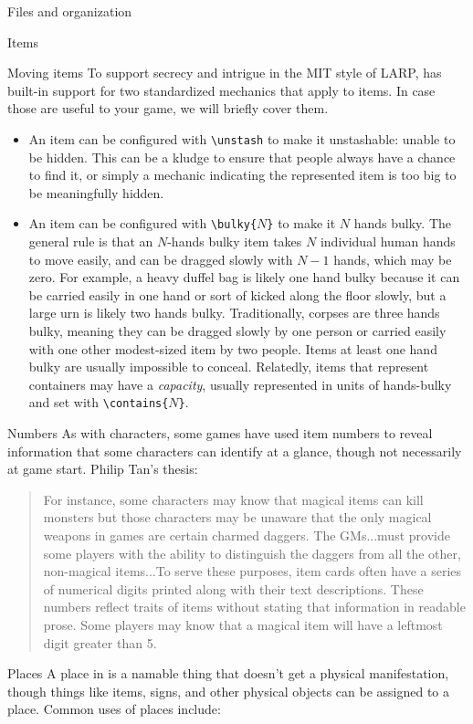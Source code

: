 \documentclass[sheet]{GameTexBase}
\begin{document}
\begin{section}{Files and organization}
\begin{subsection}{Items}
\begin{subsubsection}{Moving items}
To support secrecy and intrigue in the MIT style of LARP, \gametex{} has built-in support for two standardized mechanics that apply to items.  In case those are useful to your game, we will briefly cover them.
\begin{itemize}
\item An item can be configured with \lstinline|\unstash| to make it unstashable: unable to be hidden.  This can be a kludge to ensure that people always have a chance to find it, or simply a mechanic indicating the represented item is too big to be meaningfully hidden.
\item An item can be configured with \texttt{\textbackslash{}bulky\{$N$\}} to make it $N$ hands bulky.  The general rule is that an $N$-hands bulky item takes $N$ individual human hands to move easily, and can be dragged slowly with $N-1$ hands, which may be zero.  For example, a heavy duffel bag is likely one hand bulky because it can be carried easily in one hand or sort of kicked along the floor slowly, but a large urn is likely two hands bulky.  Traditionally, corpses are three hands bulky, meaning they can be dragged slowly by one person or carried easily with one other modest-sized item by two people.  Items at least one hand bulky are usually impossible to conceal.  Relatedly, items that represent containers may have a \emph{capacity}, usually represented in units of hands-bulky and set with \texttt{\textbackslash{}contains\{$N$\}}.
\end{itemize}
\end{subsubsection}
\begin{subsubsection}{Numbers}
As with characters, some games have used item numbers to reveal information that some characters can identify at a glance, though not necessarily at game start.  Philip Tan's thesis:
\begin{quote}
For instance, some characters may know that magical items can kill monsters but those
characters may be unaware that the only magical weapons in games are certain charmed
daggers. The GMs...must provide some players with the
ability to distinguish the daggers from all the other, non-magical items...To serve these purposes, item cards often have a series of numerical digits printed along
with their text descriptions. These numbers reflect traits of items without stating that
information in readable prose. Some players may know that a magical item will have a
leftmost digit greater than 5.
\end{quote}
\end{subsubsection}
\end{subsection}
\begin{subsection}{Places}
A place in \gametex{} is a namable thing that doesn't get a physical manifestation, though things like
items, signs, and other physical objects can be assigned to a place.  Common uses of places include:


\end{subsection}
\end{section}
\end{document}
